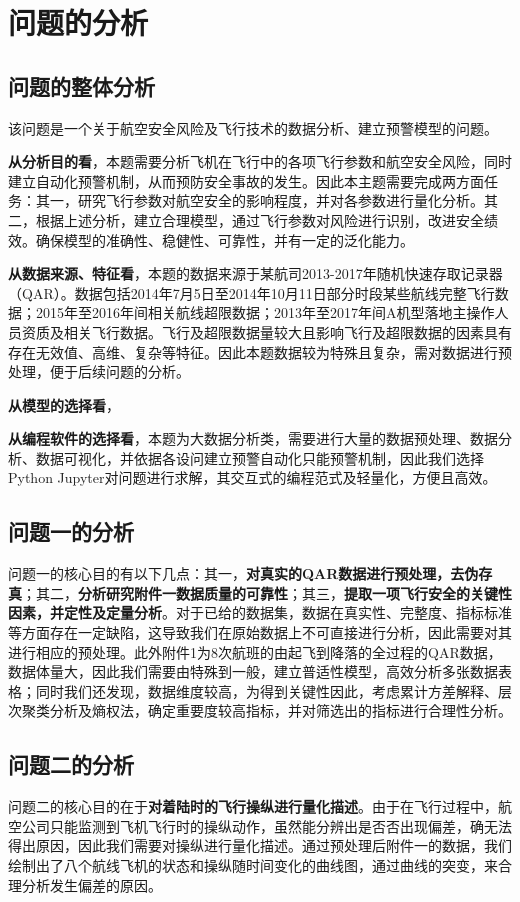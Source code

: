 \documentclass{MathorCupModeling}
\begin{document}
	\section{问题的分析}
	\subsection{问题的整体分析}
	该问题是一个关于航空安全风险及飞行技术的数据分析、建立预警模型的问题。
	
	\textbf{从分析目的看}，本题需要分析飞机在飞行中的各项飞行参数和航空安全风险，同时建立自动化预警机制，从而预防安全事故的发生。因此本主题需要完成两方面任务：其一，研究飞行参数对航空安全的影响程度，并对各参数进行量化分析。其二，根据上述分析，建立合理模型，通过飞行参数对风险进行识别，改进安全绩效。确保模型的准确性、稳健性、可靠性，并有一定的泛化能力。

	\textbf{从数据来源、特征看}，本题的数据来源于某航司2013-2017年随机快速存取记录器（QAR）。数据包括2014年7月5日至2014年10月11日部分时段某些航线完整飞行数据；2015年至2016年间相关航线超限数据；2013年至2017年间A机型落地主操作人员资质及相关飞行数据。飞行及超限数据量较大且影响飞行及超限数据的因素具有存在无效值、高维、复杂等特征。因此本题数据较为特殊且复杂，需对数据进行预处理，便于后续问题的分析。
	
	\textbf{从模型的选择看}，

	\textbf{从编程软件的选择看}，本题为大数据分析类，需要进行大量的数据预处理、数据分析、数据可视化，并依据各设问建立预警自动化只能预警机制，因此我们选择Python Jupyter对问题进行求解，其交互式的编程范式及轻量化，方便且高效。
	
	\subsection{问题一的分析}
	问题一的核心目的有以下几点：{\heiti 其一}，\textbf{对真实的QAR数据进行预处理，去伪存真}；{\heiti 其二}，\textbf{分析研究附件一数据质量的可靠性}；{\heiti 其三}，\textbf{提取一项飞行安全的关键性因素，并定性及定量分析}。对于已给的数据集，数据在真实性、完整度、指标标准等方面存在一定缺陷，这导致我们在原始数据上不可直接进行分析，因此需要对其进行相应的预处理。此外附件1为8次航班的由起飞到降落的全过程的QAR数据，数据体量大，因此我们需要由特殊到一般，建立普适性模型，高效分析多张数据表格；同时我们还发现，数据维度较高，为得到关键性因此，考虑累计方差解释、层次聚类分析及熵权法，确定重要度较高指标，并对筛选出的指标进行合理性分析。
	\subsection{问题二的分析}
	问题二的核心目的在于\textbf{对着陆时的飞行操纵进行量化描述}。由于在飞行过程中，航空公司只能监测到飞机飞行时的操纵动作，虽然能分辨出是否否出现偏差，确无法得出原因，因此我们需要对操纵进行量化描述。通过预处理后附件一的数据，我们绘制出了八个航线飞机的状态和操纵随时间变化的曲线图，通过曲线的突变，来合理分析发生偏差的原因。
\end{document}

